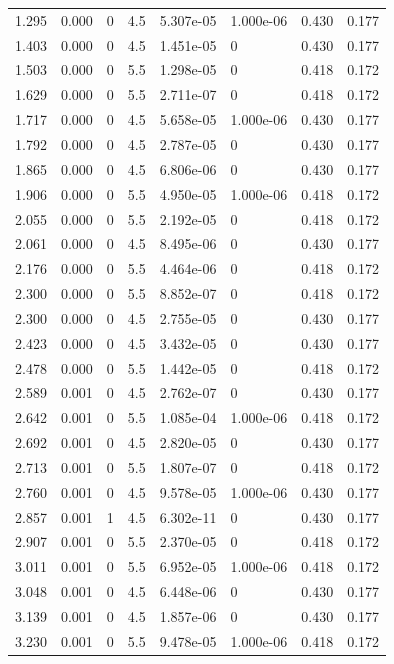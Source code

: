 \documentclass[preview]{standalone}
\begin{document}
{{\begin{tabular}{L{1.2cm}C{1.2cm} C{0.3cm}C{0.5cm} C{1.4cm}C{1.4cm} C{1.4cm}C{1.4cm}}
  1.295  &  0.000  & 0     & 4.5 &  5.307e-05  & 1.000e-06  & 0.430 &  0.177   \\ 
  1.403  &  0.000  & 0     & 4.5 &  1.451e-05  & 0  & 0.430 &  0.177   \\ 
  1.503  &  0.000  & 0     & 5.5 &  1.298e-05  & 0  & 0.418 &  0.172   \\ 
  1.629  &  0.000  & 0     & 5.5 &  2.711e-07  & 0  & 0.418 &  0.172   \\ 
  1.717  &  0.000  & 0     & 4.5 &  5.658e-05  & 1.000e-06  & 0.430 &  0.177   \\ 
  1.792  &  0.000  & 0     & 4.5 &  2.787e-05  & 0  & 0.430 &  0.177   \\ 
  1.865  &  0.000  & 0     & 4.5 &  6.806e-06  & 0  & 0.430 &  0.177   \\ 
  1.906  &  0.000  & 0     & 5.5 &  4.950e-05  & 1.000e-06  & 0.418 &  0.172   \\ 
  2.055  &  0.000  & 0     & 5.5 &  2.192e-05  & 0  & 0.418 &  0.172   \\ 
  2.061  &  0.000  & 0     & 4.5 &  8.495e-06  & 0  & 0.430 &  0.177   \\ 
  2.176  &  0.000  & 0     & 5.5 &  4.464e-06  & 0  & 0.418 &  0.172   \\ 
  2.300  &  0.000  & 0     & 5.5 &  8.852e-07  & 0  & 0.418 &  0.172   \\ 
  2.300  &  0.000  & 0     & 4.5 &  2.755e-05  & 0  & 0.430 &  0.177   \\ 
  2.423  &  0.000  & 0     & 4.5 &  3.432e-05  & 0  & 0.430 &  0.177   \\ 
  2.478  &  0.000  & 0     & 5.5 &  1.442e-05  & 0  & 0.418 &  0.172   \\ 
  2.589  &  0.001  & 0     & 4.5 &  2.762e-07  & 0  & 0.430 &  0.177   \\ 
  2.642  &  0.001  & 0     & 5.5 &  1.085e-04  & 1.000e-06  & 0.418 &  0.172   \\ 
  2.692  &  0.001  & 0     & 4.5 &  2.820e-05  & 0  & 0.430 &  0.177   \\ 
  2.713  &  0.001  & 0     & 5.5 &  1.807e-07  & 0  & 0.418 &  0.172   \\ 
  2.760  &  0.001  & 0     & 4.5 &  9.578e-05  & 1.000e-06  & 0.430 &  0.177   \\ 
  2.857  &  0.001  & 1     & 4.5 &  6.302e-11  & 0  & 0.430 &  0.177   \\ 
  2.907  &  0.001  & 0     & 5.5 &  2.370e-05  & 0  & 0.418 &  0.172   \\ 
  3.011  &  0.001  & 0     & 5.5 &  6.952e-05  & 1.000e-06  & 0.418 &  0.172   \\ 
  3.048  &  0.001  & 0     & 4.5 &  6.448e-06  & 0  & 0.430 &  0.177   \\ 
  3.139  &  0.001  & 0     & 4.5 &  1.857e-06  & 0  & 0.430 &  0.177   \\ 
  3.230  &  0.001  & 0     & 5.5 &  9.478e-05  & 1.000e-06  & 0.418 &  0.172   \\ 
\hline 
\end{tabular} 

}}
\end{document}
